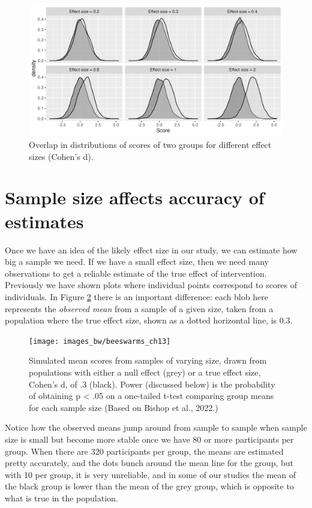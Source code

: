 \documentclass{krantz}
\begin{document}
\begin{figure}
\includegraphics[width=1\linewidth]{images_bw/densityplot} \caption{Overlap in distributions of scores of two groups for different effect sizes (Cohen's d).}\label{fig:effsizefig}
\end{figure}

\hypertarget{sample-size-affects-accuracy-of-estimates}{%
\section{Sample size affects accuracy of estimates}\label{sample-size-affects-accuracy-of-estimates}}

Once we have an idea of the likely effect size in our study, we can estimate how big a sample we need. If we have a small effect size, then we need many observations to get a reliable estimate of the true effect of intervention. Previously we have shown plots where individual points correspond to scores of individuals. In Figure \ref{fig:varES} there is an important difference: each blob here represents the \emph{observed mean} from a sample of a given size, taken from a population where the true effect size, shown as a dotted horizontal line, is 0.3.

\begin{figure}
\texttt{[image: images\_bw/beeswarms\_ch13]} \caption{Simulated mean scores from samples of varying size, drawn from populations with either a null effect (grey) or a true effect size, Cohen's d, of .3 (black). Power (discussed below) is the probability of obtaining p < .05 on a one-tailed t-test comparing group means for each sample size (Based on Bishop et al., 2022.)}\label{fig:varES}
\end{figure}

Notice how the observed means jump around from sample to sample when sample size is small but become more stable once we have 80 or more participants per group. When there are 320 participants per group, the means are estimated pretty accurately, and the dots bunch around the mean line for the group, but with 10 per group, it is very unreliable, and in some of our studies the mean of the black group is lower than the mean of the grey group, which is opposite to what is true in the population.
\end{document}
